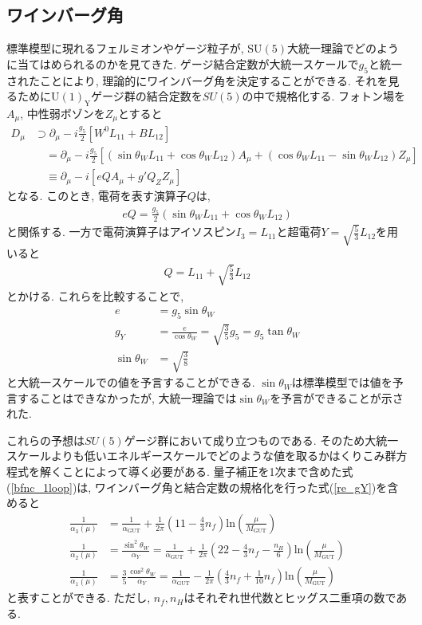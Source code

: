 \subsection{ワインバーグ角}
標準模型に現れるフェルミオンやゲージ粒子が, $\mathrm{SU(5)}$大統一理論でどのように当てはめられるのかを見てきた.
ゲージ結合定数が大統一スケールで$g_5$と統一されたことにより, 理論的にワインバーグ角を決定することができる.
それを見るために$\mathrm{U(1)_Y}$ゲージ群の結合定数を$SU(5)$の中で規格化する.
フォトン場を$A_\mu$, 中性弱ボゾンを$Z_\mu$とすると
\begin{align}
  D_\mu &\supset \partial_\mu -i\frac{g_5}{2}[W^0 L_{11} + B L_{12}]\nonumber\\
        &\quad=\partial_\mu -i\frac{g_5}{2}[(\sin\theta_W L_{11} + \cos\theta_W L_{12})A_\mu + (\cos\theta_W L_{11} -\sin\theta_W L_{12})Z_\mu]\nonumber\\
        &\quad\equiv \partial_\mu -i[eQA_\mu + g' Q_Z Z_\mu]\nonumber
\end{align}
となる.
このとき, 電荷を表す演算子$Q$は,
\begin{align}
  eQ = \frac{g_5}{2}(\sin\theta_W L_{11} + \cos\theta_W L_{12})\nonumber
\end{align}
と関係する.
一方で電荷演算子はアイソスピン$I_3 = L_{11}$と超電荷$Y=\sqrt{\frac{5}{3}}L_{12}$を用いると
\begin{align}
  Q = L_{11} + \sqrt{\frac{5}{3}}L_{12}\nonumber
\end{align}
とかける.
これらを比較することで,
\begin{align}
  e &= g_5\sin\theta_W\nonumber\\
  g_Y&= \frac{e}{\cos\theta_W}=\sqrt{\frac{3}{5}}g_5 = g_5 \tan\theta_W\label{re_gY}\\
  \sin\theta_W &=\sqrt{\frac{3}{8}}\nonumber
\end{align}
と大統一スケールでの値を予言することができる.
$\sin\theta_W$は標準模型では値を予言することはできなかったが, 大統一理論では$\sin\theta_W$を予言ができることが示された.

これらの予想は$SU(5)$ゲージ群において成り立つものである.
そのため大統一スケールよりも低いエネルギースケールでどのような値を取るかはくりこみ群方程式を解くことによって導く必要がある.
量子補正を1次まで含めた式(\ref{bfnc_1loop})は, ワインバーグ角と結合定数の規格化を行った式(\ref{re_gY})を含めると
\begin{align}
  \frac{1}{\alpha_3(\mu)} &= \frac{1}{\alpha_{\mathrm{GUT}}} +\frac{1}{2\pi}\left(11-\frac{4}{3}n_f\right)\mathrm{ln}\left(\frac{\mu}{M_{\mathrm{GUT}}}\right)\nonumber\\
  \frac{1}{\alpha_2(\mu)} &= \frac{\sin^2\theta_W}{\alpha_{Y}} =  \frac{1}{\alpha_{\mathrm{GUT}}} +\frac{1}{2\pi}\left(22-\frac{4}{3}n_f - \frac{n_H}{6}\right)\mathrm{ln}\left(\frac{\mu}{M_{\mathrm{GUT}}}\right)\nonumber\\
  \frac{1}{\alpha_1(\mu)} &= \frac{3}{5}\frac{\cos^2\theta_{W}}{\alpha_{Y}} =\frac{1}{\alpha_{\mathrm{GUT}}} -\frac{1}{2\pi}\left(\frac{4}{3}n_f+\frac{1}{10}n_f\right)\mathrm{ln}\left(\frac{\mu}{M_{\mathrm{GUT}}}\right)\nonumber
\end{align}
と表すことができる.
ただし, $n_f, n_H$はそれぞれ世代数とヒッグス二重項の数である.

